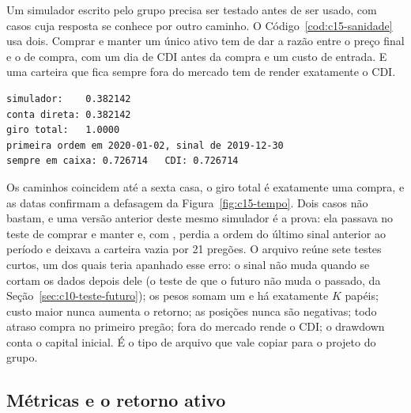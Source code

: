 

Um simulador escrito pelo grupo precisa ser testado antes de ser usado, com casos cuja resposta se conhece por outro caminho. O Código~\ref{cod:c15-sanidade} usa dois. Comprar e manter um único ativo tem de dar a razão entre o preço final e o de compra, com um dia de CDI antes da compra e um custo de entrada. E uma carteira que fica sempre fora do mercado tem de render exatamente o CDI.


\begin{lstlisting}[style=saida]
simulador:    0.382142
conta direta: 0.382142
giro total:   1.0000
primeira ordem em 2020-01-02, sinal de 2019-12-30
sempre em caixa: 0.726714   CDI: 0.726714
\end{lstlisting}

Os caminhos coincidem até a sexta casa, o giro total é exatamente uma compra, e as datas confirmam a defasagem da Figura~\ref{fig:c15-tempo}. Dois casos não bastam, e uma versão anterior deste mesmo simulador é a prova: ela passava no teste de comprar e manter e, com , perdia a ordem do último sinal anterior ao período e deixava a carteira vazia por 21 pregões. O arquivo  reúne sete testes curtos, um dos quais teria apanhado esse erro: o sinal não muda quando se cortam os dados depois dele (o teste de que o futuro não muda o passado, da Seção~\ref{sec:c10-teste-futuro}); os pesos somam um e há exatamente $K$ papéis; custo maior nunca aumenta o retorno; as posições nunca são negativas; todo atraso compra no primeiro pregão; fora do mercado rende o CDI; o drawdown conta o capital inicial. É o tipo de arquivo que vale copiar para o projeto do grupo.

\subsection{Métricas e o retorno ativo}

